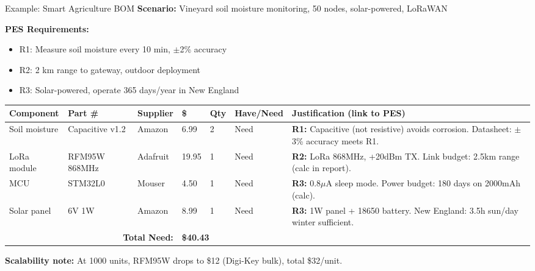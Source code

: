 \documentclass[aspectratio=169,11pt]{beamer}
\begin{document}
\begin{frame}[fragile]{Example: Smart Agriculture BOM}
    \textbf{Scenario:} Vineyard soil moisture monitoring, 50 nodes, solar-powered, LoRaWAN
    
    \vspace{0.2cm}
    \textbf{PES Requirements:}
    \begin{itemize}
        \item R1: Measure soil moisture every 10 min, $\pm$2\% accuracy
        \item R2: 2 km range to gateway, outdoor deployment
        \item R3: Solar-powered, operate 365 days/year in New England
    \end{itemize}
    
    \vspace{0.2cm}
    \footnotesize
    \begin{tabular}{p{2.2cm}p{1.8cm}p{1.2cm}p{0.8cm}p{0.6cm}p{0.9cm}p{3.5cm}}
        \toprule
        \textbf{Component} & \textbf{Part \#} & \textbf{Supplier} & \textbf{\$} & \textbf{Qty} & \textbf{Have/Need} & \textbf{Justification (link to PES)} \\
        \midrule
        Soil moisture & Capacitive v1.2 & Amazon & 6.99 & 2 & Need & \textbf{R1:} Capacitive (not resistive) avoids corrosion. Datasheet: $\pm$3\% accuracy meets R1. \\
        LoRa module & RFM95W 868MHz & Adafruit & 19.95 & 1 & Need & \textbf{R2:} LoRa 868MHz, +20dBm TX. Link budget: 2.5km range (calc in report). \\
        MCU & STM32L0 & Mouser & 4.50 & 1 & Need & \textbf{R3:} 0.8$\mu$A sleep mode. Power budget: 180 days on 2000mAh (calc). \\
        Solar panel & 6V 1W & Amazon & 8.99 & 1 & Need & \textbf{R3:} 1W panel + 18650 battery. New England: 3.5h sun/day winter sufficient. \\
        \midrule
        \multicolumn{3}{r}{\textbf{Total Need:}} & \multicolumn{4}{l}{\textbf{\$40.43}} \\
        \bottomrule
    \end{tabular}
    \normalsize
    
    \vspace{0.2cm}
    \textbf{Scalability note:} At 1000 units, RFM95W drops to \$12 (Digi-Key bulk), total \$32/unit.
\end{frame}
\end{document}
